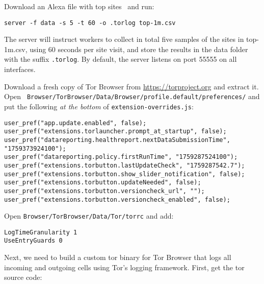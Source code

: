 \documentclass{article}
\begin{document}
Download an Alexa file with top sites~\cite{alexatop1k} and run:

\begin{lstlisting}
server -f data -s 5 -t 60 -o .torlog top-1m.csv
\end{lstlisting}
The server will instruct workers to collect in total
five samples of the sites in top-1m.csv, using 60 seconds per site visit,
and store the results in the data folder with the suffix \texttt{.torlog}.
By default, the server listens on port 55555 on all interfaces.

Download a fresh copy of Tor Browser from \url{https://torproject.org} and
extract it.  Open {\tt
Browser/TorBrowser/Data/Browser/profile.default/preferences/} and put the
following \emph{at the bottom} of \texttt{extension-overrides.js}:

\begin{lstlisting}
user_pref("app.update.enabled", false);
user_pref("extensions.torlauncher.prompt_at_startup", false);
user_pref("datareporting.healthreport.nextDataSubmissionTime", "1759373924100");
user_pref("datareporting.policy.firstRunTime", "1759287524100");
user_pref("extensions.torbutton.lastUpdateCheck", "1759287542.7");
user_pref("extensions.torbutton.show_slider_notification", false);
user_pref("extensions.torbutton.updateNeeded", false);
user_pref("extensions.torbutton.versioncheck_url", "");
user_pref("extensions.torbutton.versioncheck_enabled", false);
\end{lstlisting}

Open {\tt Browser/TorBrowser/Data/Tor/torrc} and add:

\begin{lstlisting}
LogTimeGranularity 1
UseEntryGuards 0
\end{lstlisting}

Next, we need to build a custom tor binary for Tor Browser that logs all
incoming and outgoing cells using Tor's logging framework. First, get the tor
source code:
\end{document}
